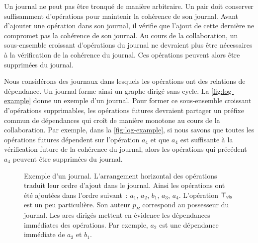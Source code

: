 Un journal ne peut pas être tronqué de manière arbitraire.
Un pair doit conserver suffisamment d'opérations pour maintenir la cohérence de son journal.
Avant d'ajouter une opération dans son journal, il vérifie que l'ajout de cette dernière ne compromet pas la cohérence de son journal.
Au cours de la collaboration, un sous-ensemble croissant d'opérations du journal ne devraient plus être nécessaires à la vérification de la cohérence du journal.
Ces opérations peuvent alors être supprimées du journal.

Nous considérons des journaux dans lesquels les opérations ont des relations de dépendance.
Un journal forme ainsi un graphe dirigé sans cycle.
La \autoref{fig:log-example} donne un exemple d'un journal.
Pour former ce sous-ensemble croissant d'opérations supprimables, les opérations futures devraient partager un préfixe commun de dépendances qui croît de manière monotone au cours de la collaboration.
Par exemple, dans la \autoref{fig:log-example}, si nous savons que toutes les opérations futures dépendent sur l'opération $a_4$ et que $a_4$ est suffisante à la vérification future de la cohérence du journal, alors les opérations qui précédent $a_4$ peuvent être supprimées du journal.

\begin{figure}[htb]
\centering
{}
\caption[Représentation d'un journal]{Exemple d'un journal.
L'arrangement horizontal des opérations traduit leur ordre d'ajout dans le journal.
Ainsi les opérations ont été ajoutées dans l'ordre suivant~: $a_1$, $a_2$, $b_1$, $a_3$, $a_4$.
L'opération $\top_{\operatorname{\mathsf{vis}}}$ est un peu particulière.
Son auteur $p_B$ correspond au possesseur du journal.
Les arcs dirigés mettent en évidence les dépendances immédiates des opérations.
Par exemple, $a_2$ est une dépendance immédiate de $a_3$ et $b_1$.
}\label{fig:log-example}
\end{figure}

